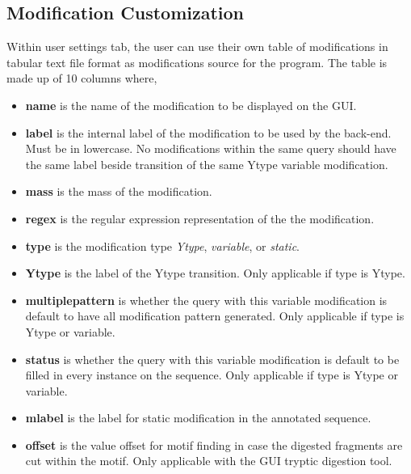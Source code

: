 \documentclass[../manual.tex]{subfiles}
\begin{document}
\subsection{Modification Customization}
Within user settings tab, the user can use their own table of modifications in tabular text file format as modifications source for the program. The table is made up of 10 columns where,\par

\begin{itemize}
	\item \textbf{name} is the name of the modification to be displayed on the GUI.
	\item \textbf{label} is the internal label of the modification to be used by the back-end. Must be in lowercase. No modifications within the same query should have the same label beside transition of the same Ytype variable modification.
	\item \textbf{mass} is the mass of the modification.
	\item \textbf{regex} is the regular expression representation of the the modification.
	\item \textbf{type} is the modification type \emph{Ytype}, \emph{variable}, or \emph{static}.
	\item \textbf{Ytype} is the label of the Ytype transition. Only applicable if type is Ytype.
	\item \textbf{multiplepattern} is whether the query with this variable modification is default to have all modification pattern generated. Only applicable if type is Ytype or variable.
	\item \textbf{status} is whether the query with this variable modification is default to be filled in every instance on the sequence. Only applicable if type is Ytype or variable.
	\item \textbf{mlabel} is the label for static modification in the annotated sequence.
	\item \textbf{offset} is the value offset for motif finding in case the digested fragments are cut within the motif. Only applicable with the GUI tryptic digestion tool.
\end{itemize}
\end{document}
